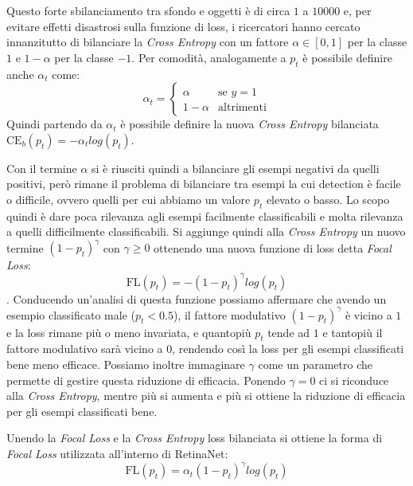 Questo forte sbilanciamento tra sfondo e oggetti è di circa $1$ a $10000$ e, per evitare effetti disastrosi sulla funzione di loss, i ricercatori hanno cercato innanzitutto di bilanciare la \textit{Cross Entropy} con un fattore $\alpha \in [0, 1]$ per la classe $1$ e $1 - \alpha$ per la classe $-1$. Per comodità, analogamente a $p_t$ è possibile definire anche $\alpha_t$ come:
$$\alpha_t = \begin{cases} \alpha &\text{se $y = 1$} \\ 1 - \alpha &\text{altrimenti}\end{cases}$$ 
Quindi partendo da $\alpha_t$ è possibile definire la nuova \textit{Cross Entropy} bilanciata $\textrm{CE}_b(p_t)=-\alpha_t log(p_t)$. 

Con il termine $\alpha$ si è riusciti quindi a bilanciare gli esempi negativi da quelli positivi, però rimane il problema di bilanciare tra esempi la cui detection è facile o difficile, ovvero quelli per cui abbiamo un valore $p_t$ elevato o basso. Lo scopo quindi è dare poca rilevanza agli esempi facilmente classificabili e molta rilevanza a quelli difficilmente classificabili. Si aggiunge quindi alla \textit{Cross Entropy} un nuovo termine $(1-p_t)^\gamma$ con $\gamma \geq 0$ ottenendo una nuova funzione di loss detta \textit{Focal Loss}:
$$\textrm{FL}(p_t) = -(1-p_t)^\gamma log(p_t)$$.
Conducendo un'analisi di questa funzione possiamo affermare che avendo un esempio classificato male ($p_t < 0.5$), il fattore modulativo $(1-p_t)^\gamma$ è vicino a $1$ e la loss rimane più o meno invariata, e quantopiù $p_t$ tende ad $1$ e tantopiù il fattore modulativo sarà vicino a $0$, rendendo così la loss per gli esempi classificati bene meno efficace.
Possiamo inoltre immaginare $\gamma$ come un parametro che permette di gestire questa riduzione di efficacia. Ponendo $\gamma = 0$ ci si riconduce alla \textit{Cross Entropy}, mentre più si aumenta e più si ottiene la riduzione di efficacia per gli esempi classificati bene. 

Unendo la \textit{Focal Loss} e la \textit{Cross Entropy} loss bilanciata si ottiene la forma di \textit{Focal Loss} utilizzata all'interno di RetinaNet:
$$\textrm{FL}(p_t) = \alpha_t(1-p_t)^\gamma log(p_t)$$
